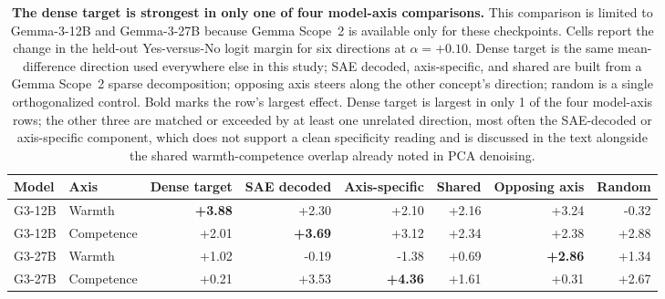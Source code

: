 \begin{table}[t]
\centering
\small
\setlength{\tabcolsep}{4pt}
\begin{tabular}{@{}llrrrrrr@{}}
\toprule
Model & Axis & Dense target & SAE decoded & Axis-specific & Shared & Opposing axis & Random \\
\midrule
G3-12B & Warmth & \textbf{+3.88} & +2.30 & +2.10 & +2.16 & +3.24 & -0.32 \\
G3-12B & Competence & +2.01 & \textbf{+3.69} & +3.12 & +2.34 & +2.38 & +2.88 \\
G3-27B & Warmth & +1.02 & -0.19 & -1.38 & +0.69 & \textbf{+2.86} & +1.34 \\
G3-27B & Competence & +0.21 & +3.53 & \textbf{+4.36} & +1.61 & +0.31 & +2.67 \\
\bottomrule
\end{tabular}
\caption{\textbf{The dense target is strongest in only one of four model-axis comparisons.} This comparison is limited to Gemma-3-12B and Gemma-3-27B because Gemma Scope~2 is available only for these checkpoints. Cells report the change in the held-out Yes-versus-No logit margin for six directions at $\alpha=+0.10$. Dense target is the same mean-difference direction used everywhere else in this study; SAE decoded, axis-specific, and shared are built from a Gemma Scope~2 sparse decomposition; opposing axis steers along the other concept's direction; random is a single orthogonalized control. Bold marks the row's largest effect. Dense target is largest in only 1 of the four model-axis rows; the other three are matched or exceeded by at least one unrelated direction, most often the SAE-decoded or axis-specific component, which does not support a clean specificity reading and is discussed in the text alongside the shared warmth-competence overlap already noted in PCA denoising.}
\label{tab:concept_direction_specificity}
\end{table}

